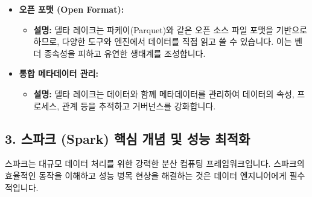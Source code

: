 \documentclass[11pt,a4paper]{article}
\begin{document}
\begin{tcolorbox}[title=\textbf{델타 레이크의 주요 기능}, colback=cyan!5!white, colframe=cyan!75!black, sharp corners, boxrule=0.8pt]
\begin{itemize}
\begin{itemize}
        \item \textbf{왜 필요한가?:} 대규모 데이터에서 쿼리 성능을 최적화하려면 불필요한 데이터 읽기를 최소화해야 합니다.
        \item \textbf{설명:} 델타 레이크는 파일 레벨의 통계(최소/최대 값 등)를 메타데이터로 저장하여 쿼리 시 관련 없는 데이터 파일을 건너뛸 수 있습니다(데이터 스키핑). Z-오더링은 여러 컬럼에 대한 쿼리 성능을 향상시키기 위해 데이터를 물리적으로 재구성하는 기술로, 데이터 지역성을 높여 I/O를 줄입니다.
    \end{itemize}
    \item \textbf{오픈 포맷 (Open Format):}
    \begin{itemize}
        \item \textbf{설명:} 델타 레이크는 파케이(Parquet)와 같은 오픈 소스 파일 포맷을 기반으로 하므로, 다양한 도구와 엔진에서 데이터를 직접 읽고 쓸 수 있습니다. 이는 벤더 종속성을 피하고 유연한 생태계를 조성합니다.
    \end{itemize}
    \item \textbf{통합 메타데이터 관리:}
    \begin{itemize}
        \item \textbf{설명:} 델타 레이크는 데이터와 함께 메타데이터를 관리하여 데이터의 속성, 프로세스, 관계 등을 추적하고 거버넌스를 강화합니다.
    \end{itemize}
\end{itemize}
\end{tcolorbox}

\subsection*{3. 스파크 (Spark) 핵심 개념 및 성능 최적화}

스파크는 대규모 데이터 처리를 위한 강력한 분산 컴퓨팅 프레임워크입니다. 스파크의 효율적인 동작을 이해하고 성능 병목 현상을 해결하는 것은 데이터 엔지니어에게 필수적입니다.
\end{document}
